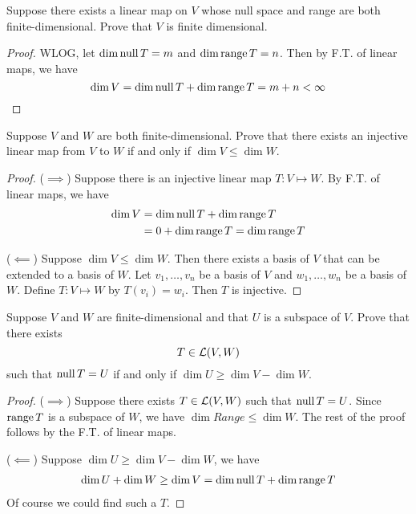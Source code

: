 \begin{exercise}
Suppose there exists a linear map on $V$ whose null space and range are both finite-dimensional. Prove that $V$ is finite dimensional.
\end{exercise}

\begin{proof}
	WLOG, let $\dim \mathop{\mathrm{null}} T = m$ and $\dim \mathop{\mathrm{range}} T = n$. Then by F.T. of linear maps, we have \[
		\dim V = \dim \mathop{\mathrm{null}} T + \dim \mathop{\mathrm{range}} T = m + n < \infty\]
\end{proof}

\begin{exercise}
Suppose $V$ and $W$ are both finite-dimensional. Prove that there exists an injective linear map from $V$ to $W$ if and only if \(\dim V \leq \dim W\).
\end{exercise}

\begin{proof}
	($\implies$) Suppose there is an injective linear map $T: V \mapsto W$. By F.T. of linear maps, we have
	\begin{align*}
		\dim V & = \dim \mathop{\mathrm{null}} T + \dim \mathop{\mathrm{range}} T      \\
		       & = 0 + \dim \mathop{\mathrm{range}} T = \dim \mathop{\mathrm{range}} T
	\end{align*}

	($\impliedby$) Suppose \(\dim V \leq \dim W\). Then there exists a basis of $V$ that can be extended to a basis of $W$. Let $v_1, \dots, v_n$ be a basis of $V$ and $w_1, \dots, w_n$ be a basis of $W$. Define $T: V \mapsto W$ by \(T(v_i) = w_i\). Then $T$ is injective.
\end{proof}

\begin{exercise}
Suppose $V$ and $W$ are finite-dimensional and that $U$ is a subspace of $V$. Prove that there exists \[T \in \mathcal{L}(V,W)\] such that \(\mathop{\mathrm{null}} T = U\) if and only if \(\dim U \geq \dim V - \dim W\).
\end{exercise}

\begin{proof}
	($\implies$) Suppose there exists \(T \in \mathcal{L}(V,W)\) such that \(\mathop{\mathrm{null}} T = U\). Since \(\mathop{\mathrm{range}} T\) is a subspace of $W$, we have \(\dim Range \leq \dim W\). The rest of the proof follows by the F.T. of linear maps.

	($\impliedby$) Suppose \(\dim U \geq \dim V - \dim W\), we have
	\begin{align*}
		\dim U + \dim W \geq \dim V = \dim \mathop{\mathrm{null}} T + \dim \mathop{\mathrm{range}} T
	\end{align*}
	Of course we could find such a $T$.
\end{proof}

